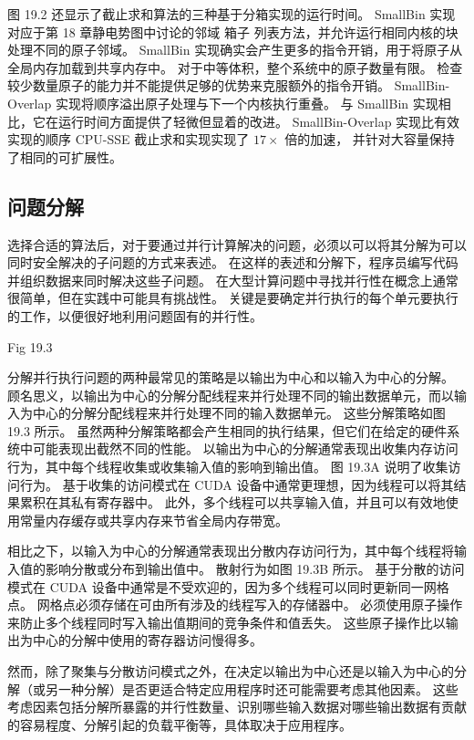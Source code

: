 图 19.2 还显示了截止求和算法的三种基于分箱实现的运行时间。 
SmallBin 实现对应于第 18 章静电势图中讨论的邻域 箱子 列表方法，并允许运行相同内核的块处理不同的原子邻域。 
SmallBin 实现确实会产生更多的指令开销，用于将原子从全局内存加载到共享内存中。 
对于中等体积，整个系统中的原子数量有限。 检查较少数量原子的能力并不能提供足够的优势来克服额外的指令开销。 
SmallBin-Overlap 实现将顺序溢出原子处理与下一个内核执行重叠。 
与 SmallBin 实现相比，它在运行时间方面提供了轻微但显着的改进。 
SmallBin-Overlap 实现比有效实现的顺序 CPU-SSE 截止求和实现实现了 $17\times$ 倍的加速，
并针对大容量保持了相同的可扩展性。

\subsection{问题分解}
选择合适的算法后，对于要通过并行计算解决的问题，必须以可以将其分解为可以同时安全解决的子问题的方式来表述。 
在这样的表述和分解下，程序员编写代码并组织数据来同时解决这些子问题。 
在大型计算问题中寻找并行性在概念上通常很简单，但在实践中可能具有挑战性。 
关键是要确定并行执行的每个单元要执行的工作，以便很好地利用问题固有的并行性。

{\color{red} Fig 19.3}

分解并行执行问题的两种最常见的策略是以输出为中心和以输入为中心的分解。 
顾名思义，以输出为中心的分解分配线程来并行处理不同的输出数据单元，而以输入为中心的分解分配线程来并行处理不同的输入数据单元。 
这些分解策略如图 19.3 所示。 虽然两种分解策略都会产生相同的执行结果，但它们在给定的硬件系统中可能表现出截然不同的性能。 
以输出为中心的分解通常表现出收集内存访问行为，其中每个线程收集或收集输入值的影响到输出值。 
图 19.3A 说明了收集访问行为。 基于收集的访问模式在 CUDA 设备中通常更理想，因为线程可以将其结果累积在其私有寄存器中。 
此外，多个线程可以共享输入值，并且可以有效地使用常量内存缓存或共享内存来节省全局内存带宽。

相比之下，以输入为中心的分解通常表现出分散内存访问行为，其中每个线程将输入值的影响分散或分布到输出值中。 
散射行为如图 19.3B 所示。 基于分散的访问模式在 CUDA 设备中通常是不受欢迎的，因为多个线程可以同时更新同一网格点。 
网格点必须存储在可由所有涉及的线程写入的存储器中。 必须使用原子操作来防止多个线程同时写入输出值期间的竞争条件和值丢失。 
这些原子操作比以输出为中心的分解中使用的寄存器访问慢得多。

然而，除了聚集与分散访问模式之外，在决定以输出为中心还是以输入为中心的分解（或另一种分解）是否更适合特定应用程序时还可能需要考虑其他因素。 
这些考虑因素包括分解所暴露的并行性数量、识别哪些输入数据对哪些输出数据有贡献的容易程度、分解引起的负载平衡等，具体取决于应用程序。

